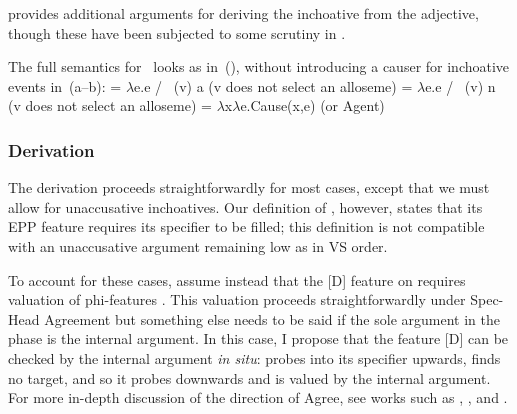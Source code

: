 

\cite{borer91} provides additional arguments for deriving the inchoative from the adjective, though these have been subjected to some scrutiny in \citet[83]{kastner16phd}.

The full semantics for \vd~looks as in~(\nextx), without introducing a causer for inchoative events in~(\nextx a--b):
\pex\label{ex:thif-sem}
	\a \denote{\vd} = $\lambda$e.e / \trace~(v) a \phantom{xxxxx} (v does not select an alloseme)
	\a \denote{\vd} = $\lambda$e.e / \trace~(v) n \phantom{xxxxx} (v does not select an alloseme)
	\a \denote{\vd} = $\lambda$x$\lambda$e.Cause(x,e) \hfill (or Agent)
\xe


		\subsubsection{Derivation}
The derivation proceeds straightforwardly for most cases, except that we must allow for unaccusative inchoatives. Our definition of {\vd}, however, states that its EPP feature requires its specifier to be filled; this definition is not compatible with an unaccusative argument remaining low as in VS order.

To account for these cases, assume instead that the [D] feature on {\vd} requires valuation of phi-features \citep{nie17,schaefer17oup}. This valuation proceeds straightforwardly under Spec-Head Agreement but something else needs to be said if the sole argument in the phase is the internal argument. In this case, I propose that the feature [D] can be checked by the internal argument \emph{in situ}: {\vd} probes into its specifier upwards, finds no target, and so it probes downwards and is valued by the internal argument. For more in-depth discussion of the direction of Agree, see works such as \cite{bejarrezac09}, \cite{zeijlstra12}, \cite{preminger13tlr} and \cite{deal15nels}.

